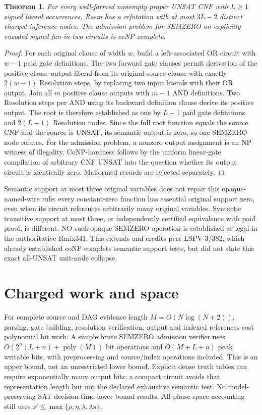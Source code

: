 \documentclass[11pt]{article}
\newtheorem{theorem}{Theorem}
\begin{document}
\begin{theorem}
For every well-formed nonempty proper UNSAT CNF with $L\ge1$ signed literal occurrences, Rsem has a refutation with at most $3L-2$ distinct charged inference nodes. The admission problem for SEMZERO on explicitly encoded signed fan-in-two circuits is coNP-complete.
\end{theorem}
\begin{proof}
For each original clause of width $w$, build a left-associated OR circuit with $w-1$ paid gate definitions. The two forward gate clauses permit derivation of the positive clause-output literal from its original source clause with exactly $2(w-1)$ Resolution steps, by replacing two input literals with their OR output. Join all $m$ positive clause outputs with $m-1$ AND definitions. Two Resolution steps per AND using its backward definition clause derive its positive output. The root is therefore established as one by $L-1$ paid gate definitions and $2(L-1)$ Resolution nodes. Since the full root function equals the source CNF and the source is UNSAT, its semantic output is zero, so one SEMZERO node refutes. For the admission problem, a nonzero output assignment is an NP witness of illegality. CoNP-hardness follows by the uniform linear-gate compilation of arbitrary CNF UNSAT into the question whether its output circuit is identically zero. Malformed records are rejected separately.
\end{proof}

Semantic support at most three original variables does not repair this opaque-named-wire rule: every constant-zero function has essential original support zero, even when its circuit references arbitrarily many original variables. Syntactic transitive support at most three, or independently certified equivalence with paid proof, is different. NO such opaque SEMZERO operation is established as legal in the authoritative Rmix341. This extends and credits peer LSPV-3/382, which already established coNP-complete semantic support tests, but did not state this exact all-UNSAT unit-node collapse.

\section*{Charged work and space}
For complete source and DAG evidence length $M=O(N\log(N+2))$, parsing, gate building, resolution verification, output and indexed references cost polynomial bit work. A simple brute SEMZERO admission verifier uses $O(2^n(L+n)+\operatorname{poly}(M))$ bit operations and $O(M+L+n)$ peak writable bits, with preprocessing and source/index operations included. This is an upper bound, not an unrestricted lower bound. Explicit dense truth tables can require exponentially many output bits; a compact circuit avoids that representation length but not the declared exhaustive semantic test. No model-preserving SAT decision-time lower bound results. All-phase space accounting still uses $s'\le\max\{\rho,\eta,\lambda,\lambda s\}$.
\end{document}
